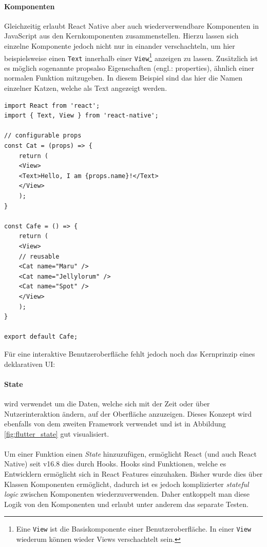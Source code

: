 \paragraph{Komponenten}
Gleichzeitig erlaubt React Native aber auch wiederverwendbare Komponenten in JavaScript aus den Kernkomponenten zusammenstellen. 
Hierzu lassen sich einzelne Komponente jedoch nicht nur in einander verschachteln, um hier beispielsweise einen \texttt{Text} innerhalb einer \texttt{View}\footnote{Eine \texttt{View} ist die Basiskomponente einer Benutzeroberfläche. In einer \texttt{View} wiederum können wieder Views verschachtelt sein.} anzeigen zu lassen.
Zusätzlich ist es möglich sogenannte \glqq props\grqq also Eigenschaften (engl.: properties), ähnlich einer normalen Funktion mitzugeben. 
In diesem Beispiel sind das hier die Namen einzelner Katzen, welche als Text angezeigt werden. \cite{reactnative2021}\\

\begin{lstlisting}[caption=Eigene Komponenten, label=lst:reactnative_own_components]
import React from 'react';
import { Text, View } from 'react-native';

// configurable props
const Cat = (props) => {
	return (
	<View>
	<Text>Hello, I am {props.name}!</Text>
	</View>
	);
}

const Cafe = () => {
	return (
	<View>
	// reusable
	<Cat name="Maru" />
	<Cat name="Jellylorum" />
	<Cat name="Spot" />
	</View>
	);
}

export default Cafe;
\end{lstlisting}

Für eine interaktive Benutzeroberfläche fehlt jedoch noch das Kernprinzip eines deklarativen UI:\\

\paragraph{State}
wird verwendet um die Daten, welche sich mit der Zeit oder über Nutzerinteraktion ändern, auf der Oberfläche anzuzeigen. Dieses Konzept wird ebenfalls von dem zweiten Framework verwendet und ist in Abbildung \ref{fig:flutter_state} gut visualisiert.\\
\\
Um einer Funktion einen \textit{State} hinzuzufügen, ermöglicht React (und auch React Native) seit v16.8 dies durch Hooks. Hooks sind Funktionen, welche es Entwicklern ermöglicht sich in React Features einzuhaken. Bisher wurde dies über Klassen Komponenten ermöglicht, dadurch ist es jedoch komplizierter \textit{stateful logic} zwischen Komponenten wiederzuverwenden. Daher entkoppelt man diese Logik von den Komponenten und erlaubt unter anderem das separate Testen.


